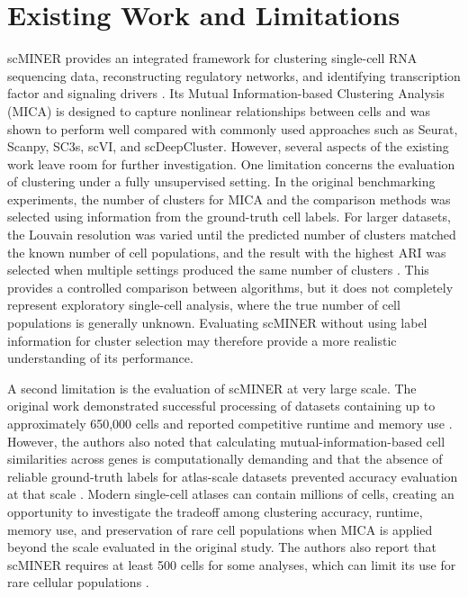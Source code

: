 \documentclass[conference]{IEEEtran}
\begin{document}
\section{Existing Work and Limitations}
scMINER provides an integrated framework for clustering single-cell RNA sequencing data, reconstructing regulatory networks, and identifying transcription factor and signaling drivers \cite{pan2025scminer}. Its Mutual Information-based Clustering Analysis (MICA) is designed to capture nonlinear relationships between cells and was shown to perform well compared with commonly used approaches such as Seurat, Scanpy, SC3s, scVI, and scDeepCluster. However, several aspects of the existing work leave room for further investigation.
One limitation concerns the evaluation of clustering under a fully unsupervised setting. In the original benchmarking experiments, the number of clusters for MICA and the comparison methods was selected using information from the ground-truth cell labels. For larger datasets, the Louvain resolution was varied until the predicted number of clusters matched the known number of cell populations, and the result with the highest ARI was selected when multiple settings produced the same number of clusters \cite{pan2025scminer}. This provides a controlled comparison between algorithms, but it does not completely represent exploratory single-cell analysis, where the true number of cell populations is generally unknown. Evaluating scMINER without using label information for cluster selection may therefore provide a more realistic understanding of its performance.

A second limitation is the evaluation of scMINER at very large scale. The original work demonstrated successful processing of datasets containing up to approximately 650,000 cells and reported competitive runtime and memory use \cite{pan2025scminer}. However, the authors also noted that calculating mutual-information-based cell similarities across genes is computationally demanding and that the absence of reliable ground-truth labels for atlas-scale datasets prevented accuracy evaluation at that scale \cite{pan2025scminer}. Modern single-cell atlases can contain millions of cells, creating an opportunity to investigate the tradeoff among clustering accuracy, runtime, memory use, and preservation of rare cell populations when MICA is applied beyond the scale evaluated in the original study. The authors also report that scMINER requires at least 500 cells for some analyses, which can limit its use for rare cellular populations \cite{pan2025scminer}.
\end{document}
